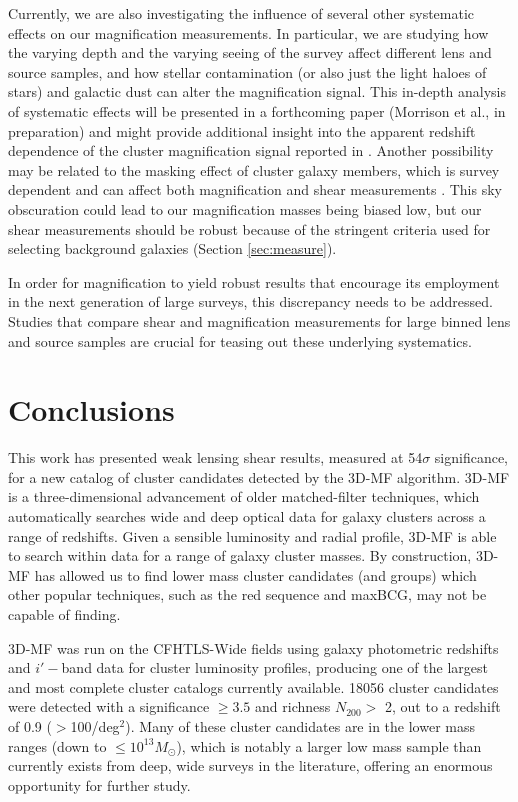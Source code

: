 Currently, we are also investigating the influence of several other systematic effects on our magnification measurements. In particular, we are studying how the varying depth and the varying seeing of the survey affect different lens and source samples, and how stellar contamination (or also just the light haloes of stars) and galactic dust can alter the magnification signal. This in-depth analysis of systematic effects will be presented in a forthcoming paper (Morrison et al., in preparation) and might provide additional insight into the apparent redshift dependence of the cluster magnification signal reported in \citet{Ford14}. Another possibility may be related to the masking effect of cluster galaxy members, which is survey dependent and can affect both magnification and shear measurements \citep{Simet14}. This sky obscuration could lead to our magnification masses being biased low, but our shear measurements should be robust because of the stringent criteria used for selecting background galaxies (Section \ref{sec:measure}).

In order for magnification to yield robust results that encourage its employment in the next generation of large surveys, this discrepancy needs to be addressed. Studies that compare shear and magnification measurements for large binned lens and source samples are crucial for teasing out these underlying systematics. 


\section{Conclusions}

This work has presented weak lensing shear results, measured at 54$\sigma$ significance, for a new catalog of cluster candidates detected by the \ac{3D-MF} algorithm. \ac{3D-MF} is a three-dimensional advancement of older matched-filter techniques, which automatically searches wide and deep optical data for galaxy clusters across a range of redshifts. Given a sensible luminosity and radial profile, \ac{3D-MF} is able to search within data for a range of galaxy cluster masses. By construction, \ac{3D-MF} has allowed us to find lower mass cluster candidates (and groups) which other popular techniques, such as the red sequence and maxBCG, may not be capable of finding. 

\ac{3D-MF} was run on the \ac{CFHTLS}-Wide fields using galaxy photometric redshifts and $i'-$band data for cluster luminosity profiles, producing one of the largest and most complete cluster catalogs currently available. 18056 cluster candidates were detected with a significance $\ge 3.5$ and richness $N_{200} >$ 2, out to a redshift of 0.9 ($>$100/deg$^2$). Many of these cluster candidates are in the lower mass ranges (down to $\leq 10^{13} M_{\odot}$), which is notably a larger low mass sample than currently exists from deep, wide surveys in the literature, offering an enormous opportunity for further study. 

